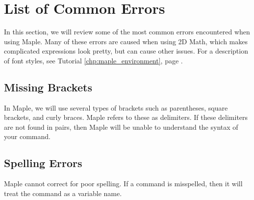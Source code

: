 \chapter{List of Common Errors}
\label{chp:list_of_common_errors}

In this section, we will review some of the most common errors encountered when using Maple. Many of these errors are caused when using 2D Math, which makes complicated expressions look pretty, but can cause other issues. For a description of font styles, see Tutorial \ref{chp:maple_environment}, page \pageref{chp:maple_environment}.

\section*{Missing Brackets}

In Maple, we will use several types of brackets such as parentheses, square brackets, and curly braces. Maple refers to these as delimiters. If these delimiters are not found in pairs, then Maple will be unable to understand the syntax of your command.

\begin{maplegroup}
\begin{mapleinput}
\mapleinline{active}{1d}{plot([f(x), g(x), x =-5..5);}{}
\end{mapleinput}
\mapleresult
\begin{maplelatex}
\end{maplelatex}
\end{maplegroup}

\section*{Spelling Errors}

Maple cannot correct for poor spelling. If a command is misspelled, then it will treat the command as a variable name.

\begin{maplegroup}
\begin{mapleinput}
\end{mapleinput}
\mapleresult
\begin{maplelatex}
\end{maplelatex}
\end{maplegroup}

